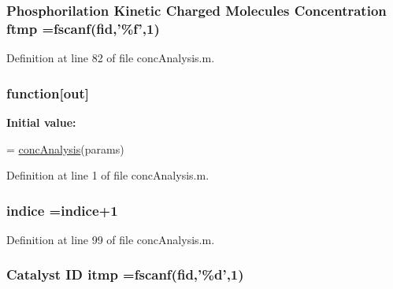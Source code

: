 \hypertarget{a00025_ad82fa813707dc406b75a0b6e38d45a3e}{
\subsubsection[{ftmp}]{\setlength{\rightskip}{0pt plus 5cm}Phosphorilation Kinetic Charged Molecules Concentration ftmp ={\bf fscanf}({\bf fid},'\%{\bf f}',1)}}\label{a00025_ad82fa813707dc406b75a0b6e38d45a3e}


Definition at line 82 of file conc\-Analysis.\-m.

\hypertarget{a00025_a370f3dd25136a73d619eba0aa2e3bb4b}{
\subsubsection[{function}]{\setlength{\rightskip}{0pt plus 5cm}function\mbox{[}{\bf out}\mbox{]}}}\label{a00025_a370f3dd25136a73d619eba0aa2e3bb4b}
{\bfseries Initial value\-:}
\begin{DoxyCode}
= \hyperlink{a00036_a18a344cbdf9b3218a438bca78547ab9e}{concAnalysis}(params)
%
%
\end{DoxyCode}


Definition at line 1 of file conc\-Analysis.\-m.

\hypertarget{a00025_a776b2bbd08be028d44f6d4260f27633a}{
\subsubsection[{indice}]{ indice =indice+1}}\label{a00025_a776b2bbd08be028d44f6d4260f27633a}


Definition at line 99 of file conc\-Analysis.\-m.

\hypertarget{a00025_af17812863fb385a507b5b07ed6166569}{
\subsubsection[{itmp}]{\setlength{\rightskip}{0pt plus 5cm}Catalyst I\-D itmp ={\bf fscanf}({\bf fid},'\%d',1)}}\label{a00025_af17812863fb385a507b5b07ed6166569}


